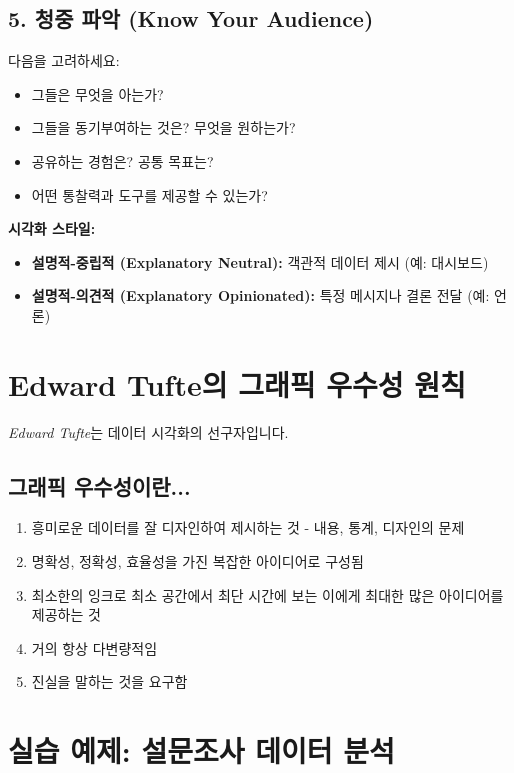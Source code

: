 \documentclass[12pt,a4paper]{article}
\begin{document}
\subsection{5. 청중 파악 (Know Your Audience)}

다음을 고려하세요:
\begin{itemize}
    \item 그들은 무엇을 아는가?
    \item 그들을 동기부여하는 것은? 무엇을 원하는가?
    \item 공유하는 경험은? 공통 목표는?
    \item 어떤 통찰력과 도구를 제공할 수 있는가?
\end{itemize}

\textbf{시각화 스타일:}
\begin{itemize}
    \item \textbf{설명적-중립적 (Explanatory Neutral):} 객관적 데이터 제시 (예: 대시보드)
    \item \textbf{설명적-의견적 (Explanatory Opinionated):} 특정 메시지나 결론 전달 (예: 언론)
\end{itemize}

\section{Edward Tufte의 그래픽 우수성 원칙}

\textit{Edward Tufte}는 데이터 시각화의 선구자입니다.

\subsection{그래픽 우수성이란...}

\begin{enumerate}
    \item 흥미로운 데이터를 잘 디자인하여 제시하는 것 - 내용, 통계, 디자인의 문제

    \item 명확성, 정확성, 효율성을 가진 복잡한 아이디어로 구성됨

    \item 최소한의 잉크로 최소 공간에서 최단 시간에 보는 이에게 최대한 많은 아이디어를 제공하는 것

    \item 거의 항상 다변량적임

    \item 진실을 말하는 것을 요구함
\end{enumerate}

\section{실습 예제: 설문조사 데이터 분석}
\end{document}
